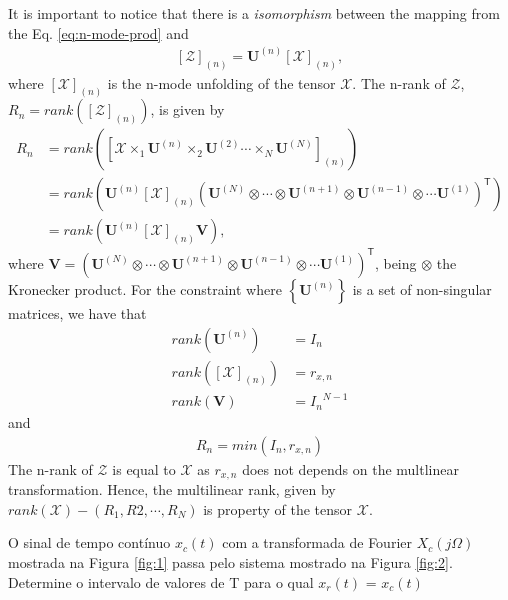 \documentclass[12pt,a4paper]{article}
\newcommand{\trans}{\mathsf{T}}
\begin{document}
It is important to notice that there is a \emph{isomorphism} between the mapping from the Eq. \eqref{eq:n-mode-prod} and
\begin{align}
    \left[\mathcal{Z}\right]_{(n)} = \mathbf{U}^{(n)} \left[\mathcal{X}\right]_{(n)},
\end{align}
where \(\left[\mathcal{X}\right]_{(n)}\) is the n-mode unfolding of the tensor \(\mathcal{X}\). The n-rank of \(\mathcal{Z}\), \(R_n = rank\left(\left[\mathcal{Z}\right]_{(n)}\right)\), is given by
\begin{align}
    \label{eq:n-rank}
    R_n &= rank\left(\left[\mathcal{X}\times_1 \mathbf{U}^{(n)}\times_2 \mathbf{U}^{(2)} \cdots \times_N \mathbf{U}^{(N)}\right]_{(n)}\right) \\
    &= rank\left(\mathbf{U}^{(n)} \left[\mathcal{X}\right]_{(n)} \left(\mathbf{U}^{(N)} \otimes \cdots \otimes \mathbf{U}^{(n+1)} \otimes \mathbf{U}^{(n-1)} \otimes \cdots \mathbf{U}^{(1)}\right)^\trans \right)\\
    &= rank\left(\mathbf{U}^{(n)} \left[\mathcal{X}\right]_{(n)} \mathbf{V} \right),
\end{align}
where $\mathbf{V} = \left(\mathbf{U}^{(N)} \otimes \cdots \otimes \mathbf{U}^{(n+1)} \otimes \mathbf{U}^{(n-1)} \otimes \cdots \mathbf{U}^{(1)}\right)^\trans$, being \(\otimes\) the Kronecker product. For the constraint where \(\left\{\mathbf{U}^{(n)}\right\}\) is a set of non-singular matrices, we have that
\begin{align}
    rank\left(\mathbf{U}^{(n)}\right)&= I_n \\
    rank\left(\left[\mathcal{X}\right]_{(n)}\right)&= r_{x,n} \\
    rank\left(\mathbf{V}\right)&={I_n}^{N-1}
\end{align}
and
\begin{align}
    R_n = min\left(I_n, r_{x,n}\right)
\end{align}
The n-rank of \(\mathcal{Z}\) is equal to \(\mathcal{X}\) as $r_{x,n}$ does not depends on the multlinear transformation. Hence, the multilinear rank, given by \(rank\left(\mathcal{X}\right)-\left(R_1,R2,\cdots, R_N\right)\) is property of the tensor \(\mathcal{X}\).



\problem O sinal de tempo contínuo \(x_c(t)\) com a transformada de Fourier \(X_c(j\Omega)\) mostrada na Figura \ref{fig:1} passa pelo sistema mostrado na Figura \ref{fig:2}. Determine o intervalo de valores de T para o qual \(x_r(t)\) = \(x_c(t)\)
\end{document}
